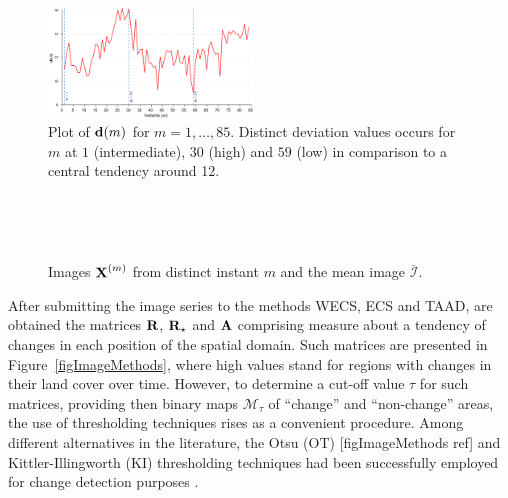 \documentclass[journal]{IEEEtran}
\newcommand{\vA}{{\textbf A}}
\newcommand{\vd}{{\textbf d}}
\newcommand{\vR}{{\textbf R}}
\newcommand{\vX}{{\textbf X}}
\begin{document}
\begin{figure}[htb!]
\centering
\includegraphics[width=0.485\textwidth]{../../graphs/LineInstants_1-30-59.pdf}
\caption{Plot of $\vd(m)$ for $m=1,\ldots,85$. Distinct deviation values occurs for $m$ at $1$ (intermediate), $30$ (high) and $59$ (low) in comparison to a central tendency around 12.}\label{F:forest_wecs}
\end{figure}



\begin{figure}[hbt]
\centering

\mbox{
}

\mbox{
}

\caption{Images $\vX^{(m)}$ from distinct instant $m$ and the mean image $\overline{\mathcal{I}}$.}
\label{F:forest_change_times}
\end{figure}



After submitting the image series to the methods WECS, ECS and TAAD, are obtained the matrices $\vR$, $\vR_{\star}$ and $\vA$ comprising measure about a tendency of changes in each position of the spatial domain. Such matrices are presented in Figure~\ref{figImageMethods}, where high values stand for regions with changes in their land cover over time.
%
However, to determine a cut-off value $\tau$ for such matrices, providing then binary maps $\mathcal{M}_{\tau}$ of ``change'' and ``non-change'' areas, the use of thresholding techniques rises as a convenient procedure. 
Among different alternatives in the literature, the Otsu (OT) [figImageMethods ref] and Kittler-Illingworth (KI) \cite{KittlerIllingworth1986} thresholding techniques had been successfully employed for change detection purposes \cite{JohnsonKasischke1998,Nielsen2007,WuEA2014,NegriEA2021}.
\end{document}
